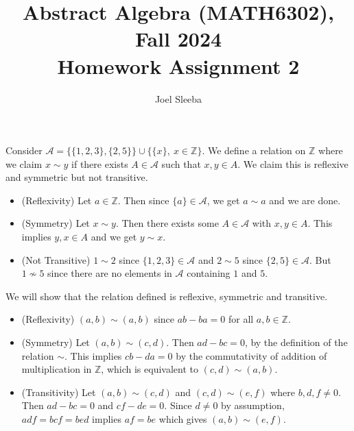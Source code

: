 \documentclass[12pt]{exam}
\theoremstyle{plain} %
\theoremstyle{definition} %
\theoremstyle{remark} %
\begin{document}
\title{Abstract Algebra (MATH6302), Fall 2024 \\ Homework Assignment 2}

\author{
Joel Sleeba \\
}

\maketitle
\printanswers
\unframedsolutions

\begin{questions}

  \question
  \begin{solution}
    Consider $\mathcal{A} = \{ \{ 1, 2, 3 \}, \{ 2, 5 \} \} \cup \{  \{ x \},  \ x \in \mathbb{Z} \}$. We define a relation on $\mathbb{Z}$ where we claim $x \sim y$ if there exists $A \in \mathcal{A}$ such that $x, y \in A$. We claim this is reflexive and symmetric but not transitive.
    \begin{itemize}[]
      \item (Reflexivity) Let $a \in \mathbb{Z}$. Then since $\{ a \} \in \mathcal{A}$, we get $a \sim a$ and we are done.
      \item (Symmetry) Let $x \sim y$. Then there exists some $A \in \mathcal{A}$ with $x, y \in A$. This implies $y, x \in A$ and we get $ y \sim x$.
      \item (Not Transitive) $1 \sim 2$ since $ \{ 1, 2, 3 \} \in \mathcal{A}$ and $2 \sim 5$ since $\{ 2, 5 \} \in \mathcal{A}$. But $1 \not \sim 5$ since there are no elements in $\mathcal{A}$ containing $1$ and $5$.
    \end{itemize}
  \end{solution}


  \question
  \begin{solution}
    We will show that the relation defined is reflexive, symmetric and transitive. \begin{itemize}[]
      \item (Reflexivity) $(a, b) \sim (a, b)$ since $ab - ba = 0$ for all $a, b \in \mathbb{Z}$.
      \item (Symmetry) Let $(a, b) \sim (c, d)$. Then $ad-bc = 0$, by the definition of the relation $\sim$. This implies $cb - da = 0$ by the commutativity of addition of multiplication in $\mathbb{Z}$, which is equivalent to $(c, d) \sim (a, b)$.
      \item (Transitivity) Let $(a, b) \sim (c, d)$ and $(c, d) \sim (e, f)$ where $b, d, f \neq 0$. Then $ad-bc = 0$ and $cf- de = 0$. Since $d \neq 0$ by assumption,  $adf = bcf = bed$ implies $af = be$ which gives $(a, b) \sim (e, f)$.
    \end{itemize}
  \end{solution}


\end{questions}
\end{document}

